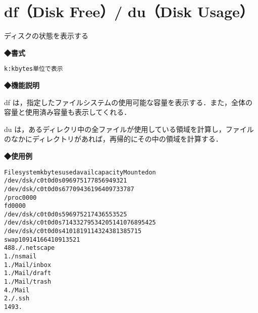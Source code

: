 
\section{df（Disk Free）/ du（Disk Usage）}
ディスクの状態を表示する\par
\label{cmd:dfdu}
\noindent
{\bf ◆書式}
\begin{center}
\begin{screen}
\begin{alltt}
% df [-k] ファイルシステム
% du [-k] ディレクトリ名

    k:kbytes単位で表示
\end{alltt}
\end{screen}
\end{center}

\noindent
{\bf ◆機能説明}

df は，指定したファイルシステムの使用可能な容量を表示する．また，全体の容量と使用済み容量も表示してくれる．\par
du は，あるディレクリ中の全ファイルが使用している領域を計算し，ファイルのなかにディレクトリがあれば，再帰的にその中の領域を計算する．\par

\noindent
{\bf ◆使用例}
\begin{center}
\begin{breakbox}
\begin{alltt}
% \underline{df -k}  （←各パーティションの容量の情報を1kバイト単位で表示する）
Filesystem            kbytes    used   avail capacity  Mounted on
/dev/dsk/c0t0d0s0      96975   17785   69493    21%    /
/dev/dsk/c0t0d0s6     770943  619640   97337    87%    /usr
/proc                      0       0       0     0%    /proc
fd                         0       0       0     0%    /dev/fd
/dev/dsk/c0t0d0s5      96975   21743   65535    25%    /var
/dev/dsk/c0t0d0s7  14332795 3420514 10768954    25%    /export/home
/dev/dsk/c0t0d0s4    1018191  143243  813857    15%    /opt
swap                 1091416      64 1091352     1%    /tmp
% \underline{du}  （←カレンントディレクトリにあるファイルの容量をみる）
488     ./.netscape
1       ./nsmail
1       ./Mail/inbox
1       ./Mail/draft
1       ./Mail/trash
4       ./Mail
2       ./.ssh
1493    .
%
\end{alltt}
\end{breakbox}
\end{center}
\clearpage
